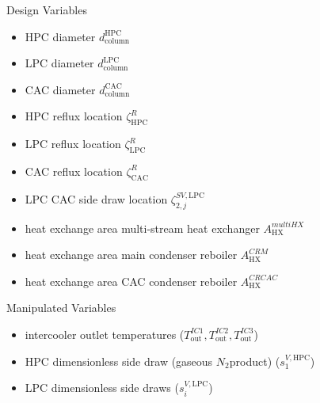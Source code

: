     Design Variables
    \begin{itemize}
        \item HPC diameter $d_{\text{column}}^{\text{HPC}}$
        \item LPC diameter $d_{\text{column}}^{\text{LPC}}$
        \item CAC diameter $d_{\text{column}}^{\text{CAC}}$
        \item HPC reflux location $\zeta^R_{\text{HPC}}$
        \item LPC reflux location $\zeta^R_{\text{LPC}}$
        \item CAC reflux location $\zeta^R_{\text{CAC}}$
        \item LPC CAC side draw location $\zeta^{SV,\text{LPC}}_{2,j}$
        \item heat exchange area multi-stream heat exchanger $A_{\text{HX}}^{multiHX}$
        \item heat exchange area main condenser reboiler $A_{\text{HX}}^{CRM}$
        \item heat exchange area CAC condenser reboiler $A_{\text{HX}}^{CRCAC}$
    \end{itemize}

    Manipulated Variables
    \begin{itemize}
        \item intercooler outlet temperatures ($T_{\text{out}}^{IC1}, T_{\text{out}}^{IC2}, T_{\text{out}}^{IC3}$)
        \item HPC dimensionless side draw (gaseous $N_2$product) ($s_1^{V, \text{HPC}}$)
        \item LPC dimensionless side draws ($s_i^{V, \text{LPC}}$)
    \end{itemize}

